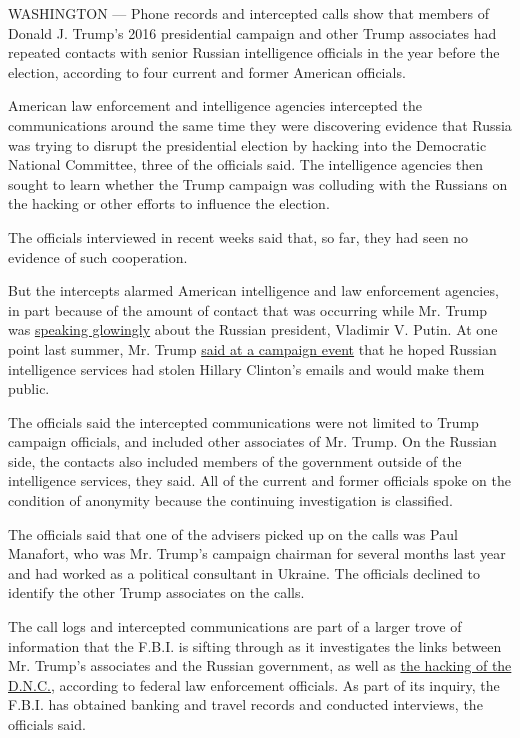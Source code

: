 WASHINGTON --- Phone records and intercepted calls show that members of
Donald J. Trump's 2016 presidential campaign and other Trump associates
had repeated contacts with senior Russian intelligence officials in the
year before the election, according to four current and former American
officials.

American law enforcement and intelligence agencies intercepted the
communications around the same time they were discovering evidence that
Russia was trying to disrupt the presidential election by hacking into
the Democratic National Committee, three of the officials said. The
intelligence agencies then sought to learn whether the Trump campaign
was colluding with the Russians on the hacking or other efforts to
influence the election.

The officials interviewed in recent weeks said that, so far, they had
seen no evidence of such cooperation.

But the intercepts alarmed American intelligence and law enforcement
agencies, in part because of the amount of contact that was occurring
while Mr. Trump was
\href{https://www.nytimes.com/2016/09/09/us/politics/hillary-clinton-donald-trump-putin.html}{speaking
glowingly} about the Russian president, Vladimir V. Putin. At one point
last summer, Mr. Trump
\href{http://www.nytimes.com/2016/07/28/us/politics/donald-trump-russia-clinton-emails.html}{said
at a campaign event} that he hoped Russian intelligence services had
stolen Hillary Clinton's emails and would make them public.

The officials said the intercepted communications were not limited to
Trump campaign officials, and included other associates of Mr. Trump. On
the Russian side, the contacts also included members of the government
outside of the intelligence services, they said. All of the current and
former officials spoke on the condition of anonymity because the
continuing investigation is classified.

The officials said that one of the advisers picked up on the calls was
Paul Manafort, who was Mr. Trump's campaign chairman for several months
last year and had worked as a political consultant in Ukraine. The
officials declined to identify the other Trump associates on the calls.

The call logs and intercepted communications are part of a larger trove
of information that the F.B.I. is sifting through as it investigates the
links between Mr. Trump's associates and the Russian government, as well
as
\href{https://www.nytimes.com/2017/01/11/us/politics/trumps-press-conference-highlights-russia.html}{the
hacking of the D.N.C.}, according to federal law enforcement officials.
As part of its inquiry, the F.B.I. has obtained banking and travel
records and conducted interviews, the officials said.

